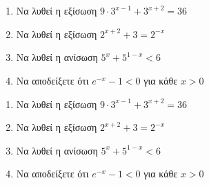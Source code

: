 \documentclass[12pt]{article}
\begin{document}
\part*{}

\begin{enumerate}
  \item Να λυθεί η εξίσωση $9\cdot3^{x-1}+3^{x+2}=36$
  \item Να λυθεί η εξίσωση $2^{x+2}+3=2^{-x}$
  \item Να λυθεί η ανίσωση $5^x+5^{1-x}<6$
  \item Να αποδείξετε ότι $e^{-x}-1<0$ για κάθε $x>0$
\end{enumerate}

\pagebreak

\begin{enumerate}
  \item Να λυθεί η εξίσωση $9\cdot3^{x-1}+3^{x+2}=36$
  \item Να λυθεί η εξίσωση $2^{x+2}+3=2^{-x}$
  \item Να λυθεί η ανίσωση $5^x+5^{1-x}<6$
  \item Να αποδείξετε ότι $e^{-x}-1<0$ για κάθε $x>0$
\end{enumerate}

\part*{}
\end{document}
